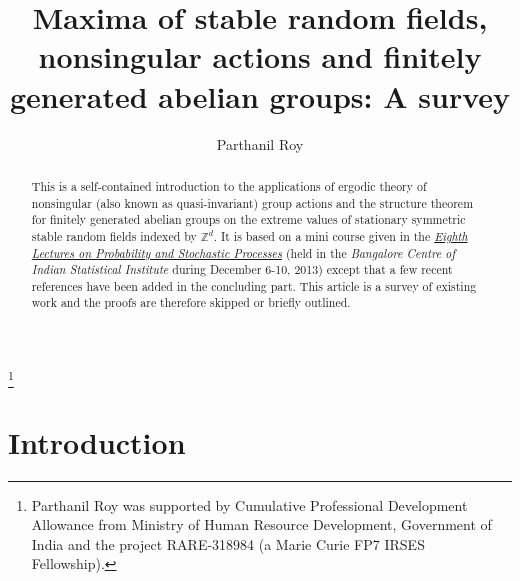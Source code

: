 \documentclass[12pt]{amsart}
\begin{document}
\allowdisplaybreaks

\newtheorem{thm}{Theorem}[section]
\newtheorem{remark}[thm]{Remark}
\newtheorem{propn}[thm]{Proposition}
\newtheorem{qn}[thm]{Question}
\newtheorem{exc}{Exercise}
\newtheorem{problem}[thm]{Problem}
\newtheorem{prop}[thm]{Property}
\newtheorem{example}[thm]{Example}
\newtheorem{defn}[thm]{Definition}
\newtheorem{claim}[thm]{Claim}
\newtheorem{lemma}[thm]{Lemma}
\newtheorem{cor}[thm]{Corollary}
\newtheorem{ann}[thm]{Announcement}


\title{Maxima of stable random fields, nonsingular actions and finitely generated abelian groups: A survey}
\author{Parthanil Roy}
       \address{Theoretical Statistics and Mathematics Unit, Indian Statistical Institute, 8th Mile, Mysore Road, RVCE Post, Bengaluru 560059, India.}
       \thanks{Parthanil Roy was supported by Cumulative Professional Development Allowance from Ministry of Human Resource Development, Government of India and the project RARE-318984 (a Marie Curie FP7 IRSES Fellowship).}
        \maketitle

\begin{abstract}
This is a self-contained introduction to the applications of ergodic theory of nonsingular (also known as quasi-invariant) group actions and the structure theorem for finitely generated abelian groups on the extreme values of stationary symmetric stable random fields indexed by $\mathbb{Z}^d$. It is based on a mini course given in the \href{http://www.isid.ac.in/~lps16/PastWebsites/LPS8/index.html}{\emph{Eighth Lectures on Probability and Stochastic Processes}} (held in the \emph{Bangalore Centre of Indian Statistical Institute} during December 6-10, 2013) except that a few recent references have been added in the concluding part. This article is a survey of existing work and the proofs are therefore skipped or briefly outlined.
\end{abstract}

\section{Introduction}
\end{document}
